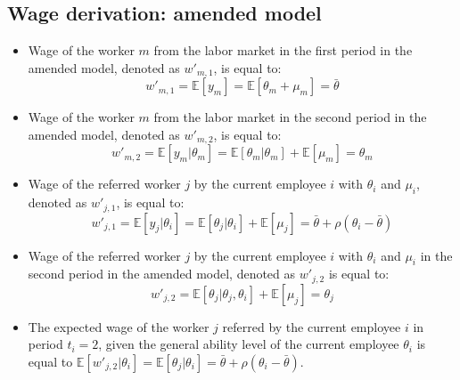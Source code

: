 \documentclass[12pt]{article}
\begin{document}
\subsection*{Wage derivation: amended model}
\begin{itemize}
    \item Wage of the worker $m$ from the labor market in the first period in the amended model, denoted as $w'_{m,1}$, is equal to:
    \begin{equation*}
        w'_{m,1} = \mathbb{E}[y_{m}] = \mathbb{E}[\theta_m + \mu_m] = \bar{\theta}
    \end{equation*}
    
    \item Wage of the worker $m$ from the labor market in the second period in the amended model, denoted as $w'_{m,2}$, is equal to:
    \begin{equation*}
        w'_{m,2} = \mathbb{E}[y_{m}|\theta_{m}] = \mathbb{E}[\theta_{m}|\theta_m] + \mathbb{E}[\mu_{m}] = \theta_m
    \end{equation*}
    
    \item Wage of the referred worker $j$ by the current employee $i$ with $\theta_i$ and $\mu_i$, denoted as $w'_{j,1}$, is equal to:
    \begin{equation}\label{eq_ext_w_j_1}
    w'_{j,1} = \mathbb{E}[y_j|\theta_{i}] = 
    \mathbb{E}[\theta_j|\theta_{i}] + \mathbb{E}[\mu_j]
    =
    \bar{\theta}+\rho(\theta_i-\bar{\theta})
    \end{equation}
    \item Wage of the referred worker $j$ by the current employee $i$ with $\theta_i$ and $\mu_i$ in the second period in the amended model, denoted as $w'_{j,2}$ is equal to: 
    \begin{equation}
        w'_{j,2} = \mathbb{E}[\theta_j|\theta_j,\theta_i] + \mathbb{E}[\mu_j] = \theta_j
    \end{equation}
    \item The expected wage of the worker $j$ referred by the current employee $i$ in period $t_i = 2$, given the general ability level of the current employee $\theta_i$ is equal to $\mathbb{E}[w'_{j,2}|\theta_i] = \mathbb{E}[\theta_j | \theta_i] = \bar{\theta} + \rho(\theta_i-\bar{\theta})$.
\end{itemize}
\end{document}
